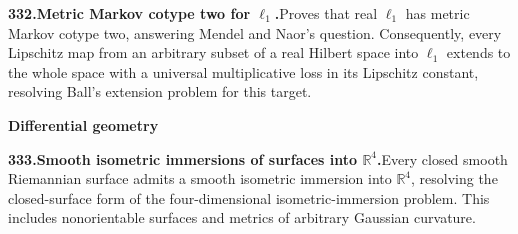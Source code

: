 \documentclass[11pt,a4paper]{article}
\begin{document}
  \par \begin{minipage}{\linewidth}
  \fontsize{10.5}{12.6}\selectfont\RaggedRight
  \hypertarget{result 332}{}
  {\bfseries\textcolor{muted}{332.}\enspace Metric Markov cotype two for $\ell_1$.}\enspace Proves that real $\ell_1$ has metric Markov cotype two, answering Mendel and Naor's question. Consequently, every Lipschitz map from an arbitrary subset of a real Hilbert space into $\ell_1$ extends to the whole space with a universal multiplicative loss in its Lipschitz constant, resolving Ball's extension problem for this target.\par
  \end{minipage}\par\vspace{5pt}



  \par{}\addvspace{12pt}
  \hypertarget{subject 7}{}\label{subject 7}
  {\fontsize{15}{18}\selectfont\bfseries Differential geometry\par}
  \nobreak\vspace{9pt}\nobreak



  \par \begin{minipage}{\linewidth}
  \fontsize{10.5}{12.6}\selectfont\RaggedRight
  \hypertarget{result 333}{}
  {\bfseries\textcolor{muted}{333.}\enspace Smooth isometric immersions of surfaces into $\mathbb R^4$.}\enspace Every closed smooth Riemannian surface admits a smooth isometric immersion into $\mathbb R^4$, resolving the closed-surface form of the four-dimensional isometric-immersion problem. This includes nonorientable surfaces and metrics of arbitrary Gaussian curvature.\par
  \end{minipage}\par\vspace{5pt}
\end{document}
